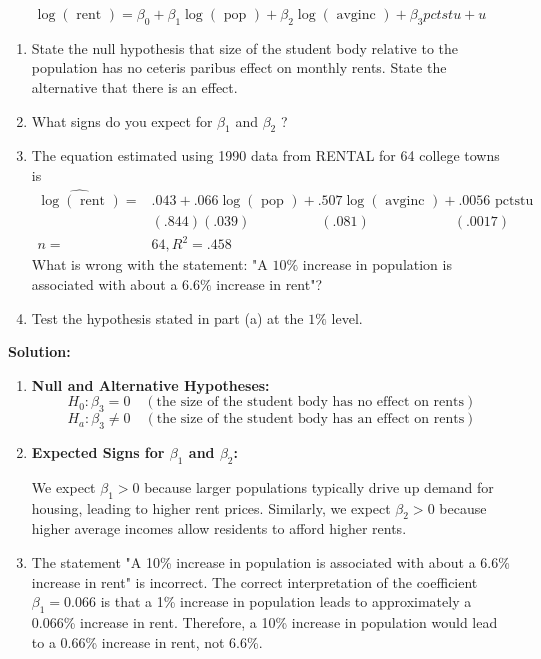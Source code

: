 \documentclass[12pt]{article}
\begin{document}
\begin{enumerate}
$$
\log (\text { rent })=\beta_0+\beta_1 \log (\text { pop })+\beta_2 \log (\text { avginc })+\beta_3 p c t s t u+u
$$
\begin{enumerate}
    \item State the null hypothesis that size of the student body relative to the population has no ceteris paribus effect on monthly rents. State the alternative that there is an effect.
    \item  What signs do you expect for $\beta_1$ and $\beta_2$ ?
    \item  The equation estimated using 1990 data from RENTAL for 64 college towns is
$$
\begin{aligned}
\widehat{\log (\text { rent })}= & .043+.066 \log (\text { pop })+.507 \log (\text { avginc })+.0056 \text { pctstu } \\
& (.844)(.039)\quad\quad\quad \quad\quad(.081)\quad\quad \quad\quad\quad\quad(.0017)\\
n= & 64, R^2=.458
\end{aligned}
$$
 What is wrong with the statement: "A $10 \%$ increase in population is associated with about a $6.6 \%$ increase in rent"?
    \item  Test the hypothesis stated in part (a) at the $1 \%$ level.

\end{enumerate}
{\color{blue}
\noindent \textbf{Solution:}

\begin{enumerate}
    \item \textbf{Null and Alternative Hypotheses:}
    \[
    H_0: \beta_3 = 0 \quad (\text{the size of the student body has no effect on rents})
    \]
    \[
    H_a: \beta_3 \neq 0 \quad (\text{the size of the student body has an effect on rents})
    \]

    \item \textbf{Expected Signs for \(\beta_1\) and \(\beta_2\):}

    We expect \(\beta_1 > 0\) because larger populations typically drive up demand for housing, leading to higher rent prices. Similarly, we expect \(\beta_2 > 0\) because higher average incomes allow residents to afford higher rents.

    \item    The statement "A 10\% increase in population is associated with about a 6.6\% increase in rent" is incorrect. The correct interpretation of the coefficient \( \beta_1 = 0.066 \) is that a 1\% increase in population leads to approximately a 0.066\% increase in rent. Therefore, a 10\% increase in population would lead to a 0.66\% increase in rent, not 6.6\%.


\end{enumerate}}
\end{enumerate}
\end{document}

